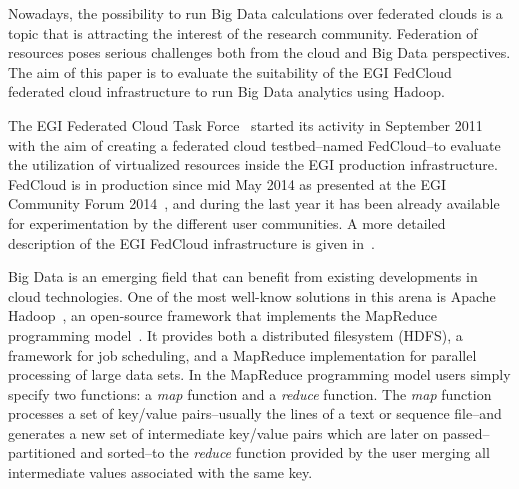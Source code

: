 

Nowadays, the possibility to run Big Data calculations over federated clouds is a topic that is attracting the interest of the research community. Federation of resources poses serious challenges both from the cloud and Big Data perspectives. The aim of this paper is to evaluate the suitability of the EGI FedCloud federated cloud infrastructure to run Big Data analytics using Hadoop. 

The EGI Federated Cloud Task Force~\cite{fedcloudtaskforce} started its activity in September 2011 with the aim of creating a federated cloud testbed--named FedCloud--to evaluate the utilization of virtualized resources inside the EGI production infrastructure. 
FedCloud is in production since mid May 2014 as presented at the EGI Community Forum 2014~\cite{fedcloud}, and during the last year it has been already available for experimentation by the different user communities. A more detailed description of the EGI FedCloud infrastructure is given in~\cite{fedcloudpaper}.

%

Big Data is an emerging field that can benefit from existing developments in cloud technologies. One of the  most well-know solutions in this arena is Apache Hadoop~\cite{hadoop}, an open-source framework that implements the MapReduce programming model~\cite{mapreduce}. It provides both a distributed filesystem (HDFS), a framework for job scheduling, and a MapReduce implementation for parallel processing of large data sets. In the MapReduce programming model users simply specify two functions: a \emph{map} function and a \emph{reduce} function. The \emph{map} function processes a set of key/value pairs--usually the lines of a text or sequence file--and generates a new set of intermediate key/value pairs which are later on passed--partitioned and sorted--to the \emph{reduce} function provided by the user merging all intermediate values associated with the same key.

